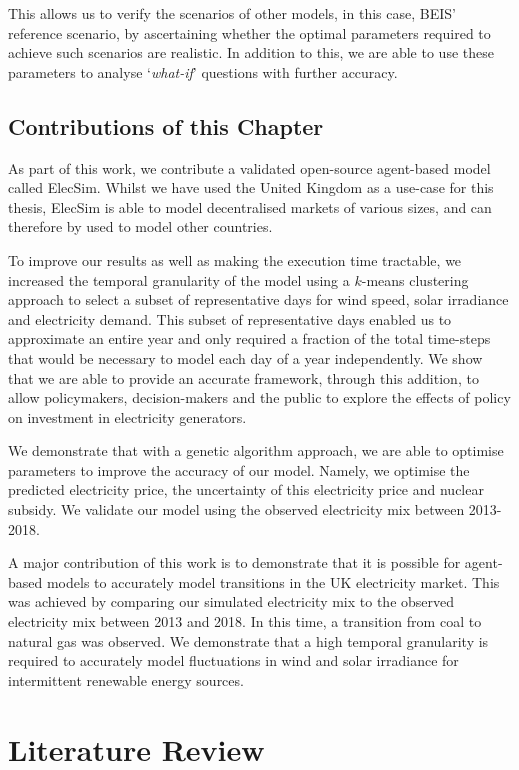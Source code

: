 This allows us to verify the scenarios of other models, in this case, BEIS' reference scenario, by ascertaining whether the optimal parameters required to achieve such scenarios are realistic. In addition to this, we are able to use these parameters to analyse `\textit{what-if}' questions with further accuracy.


\subsection{Contributions of this Chapter}

As part of this work, we contribute a validated open-source agent-based model called ElecSim. Whilst we have used the United Kingdom as a use-case for this thesis, ElecSim is able to model decentralised markets of various sizes, and can therefore by used to model other countries. 

To improve our results as well as making the execution time tractable, we increased the temporal granularity of the model using a $k$-means clustering approach to select a subset of representative days for wind speed, solar irradiance and electricity demand. This subset of representative days enabled us to approximate an entire year and only required a fraction of the total time-steps that would be necessary to model each day of a year independently. We show that we are able to provide an accurate framework, through this addition, to allow policymakers, decision-makers and the public to explore the effects of policy on investment in electricity generators. 

We demonstrate that with a genetic algorithm approach, we are able to optimise parameters to improve the accuracy of our model. Namely, we optimise the predicted electricity price, the uncertainty of this electricity price and nuclear subsidy. We validate our model using the observed electricity mix between 2013-2018.

A major contribution of this work is to demonstrate that it is possible for agent-based models to accurately model transitions in the UK electricity market. This was achieved by comparing our simulated electricity mix to the observed electricity mix between 2013 and 2018. In this time, a transition from coal to natural gas was observed. We demonstrate that a high temporal granularity is required to accurately model fluctuations in wind and solar irradiance for intermittent renewable energy sources.


\clearpage
\section{Literature Review}
\label{elecsim:sec:litreview}

